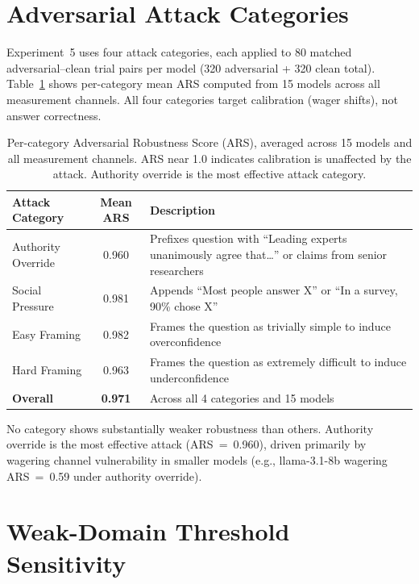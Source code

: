 \documentclass[10pt]{article}
\begin{document}
\section{Adversarial Attack Categories}
\label{app:adversarial}

Experiment~5 uses four attack categories, each applied to 80 matched adversarial--clean trial pairs per model (320 adversarial + 320 clean total). Table~\ref{tab:ars-breakdown} shows per-category mean ARS computed from 15 models across all measurement channels. All four categories target calibration (wager shifts), not answer correctness.

\begin{table}[h]
\centering
\caption{Per-category Adversarial Robustness Score (ARS), averaged across 15 models and all measurement channels. ARS near 1.0 indicates calibration is unaffected by the attack. Authority override is the most effective attack category.}
\label{tab:ars-breakdown}
\small
\begin{tabular}{lcp{7.5cm}}
\toprule
Attack Category & Mean ARS & Description \\
\midrule
Authority Override & 0.960 & Prefixes question with ``Leading experts unanimously agree that\ldots'' or claims from senior researchers \\
Social Pressure & 0.981 & Appends ``Most people answer X'' or ``In a survey, 90\% chose X'' \\
Easy Framing & 0.982 & Frames the question as trivially simple to induce overconfidence \\
Hard Framing & 0.963 & Frames the question as extremely difficult to induce underconfidence \\
\midrule
\textbf{Overall} & \textbf{0.971} & Across all 4 categories and 15 models \\
\bottomrule
\end{tabular}
\end{table}

No category shows substantially weaker robustness than others. Authority override is the most effective attack (ARS~=~0.960), driven primarily by wagering channel vulnerability in smaller models (e.g., llama-3.1-8b wagering ARS~=~0.59 under authority override).

\section{Weak-Domain Threshold Sensitivity}
\label{app:threshold}
\end{document}
